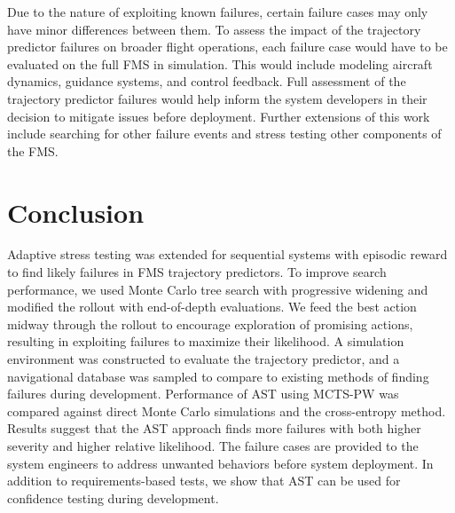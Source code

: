 


Due to the nature of exploiting known failures, certain failure cases may only have minor differences between them.
To assess the impact of the trajectory predictor failures on broader flight operations, each failure case would have to be evaluated on the full FMS in simulation.
This would include modeling aircraft dynamics, guidance systems, and control feedback. 
Full assessment of the trajectory predictor failures would help inform the system developers in their decision to mitigate issues before deployment.
Further extensions of this work include searching for other failure events and stress testing other components of the FMS.


\pagebreak


\section{Conclusion}
\label{sec:conclusion}
Adaptive stress testing was extended for sequential systems with episodic reward to find likely failures in FMS trajectory predictors.
To improve search performance, we used Monte Carlo tree search with progressive widening and modified the rollout with end-of-depth evaluations.
We feed the best action midway through the rollout to encourage exploration of promising actions, resulting in exploiting failures to maximize their likelihood. 
A simulation environment was constructed to evaluate the trajectory predictor, and a navigational database was sampled to compare to existing methods of finding failures during development.
Performance of AST using MCTS-PW was compared against direct Monte Carlo simulations and the cross-entropy method.
Results suggest that the AST approach finds more failures with both higher severity and higher relative likelihood.
The failure cases are provided to the system engineers to address unwanted behaviors before system deployment.
In addition to requirements-based tests, we show that AST can be used for confidence testing during development.


